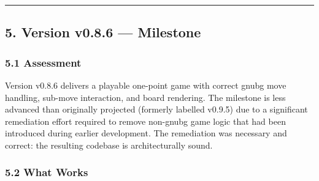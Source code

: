 \documentclass[11pt,a4paper]{article}
\begin{document}
\begin{center}\rule{0.5\linewidth}{0.5pt}\end{center}

\subsection{5. Version v0.8.6 --- Milestone}\label{version-v085}

\subsubsection{5.1 Assessment}\label{assessment-v085}

Version v0.8.6 delivers a playable one-point game with correct gnubg
move handling, sub-move interaction, and board rendering. The milestone
is less advanced than originally projected (formerly labelled v0.9.5)
due to a significant remediation effort required to remove non-gnubg game
logic that had been introduced during earlier development. The remediation
was necessary and correct: the resulting codebase is architecturally
sound.

\subsubsection{5.2 What Works}\label{what-works-v085}
\end{document}
